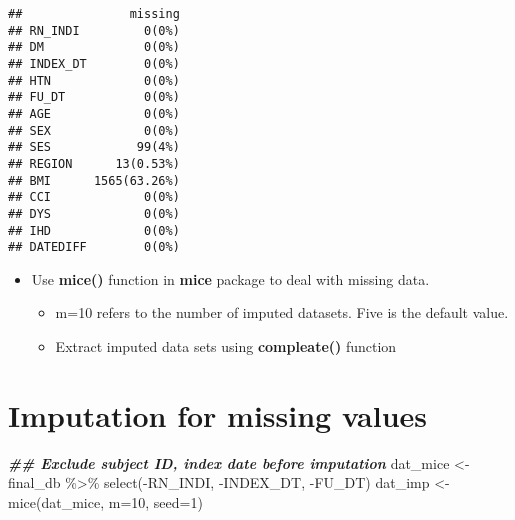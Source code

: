 \documentclass[
]{book}
\newenvironment{Shaded}{\begin{snugshade}}{\end{snugshade}}
\newcommand{\AttributeTok}[1]{\textcolor[rgb]{0.77,0.63,0.00}{#1}}
\newcommand{\DecValTok}[1]{\textcolor[rgb]{0.00,0.00,0.81}{#1}}
\newcommand{\DocumentationTok}[1]{\textcolor[rgb]{0.56,0.35,0.01}{\textbf{\textit{#1}}}}
\newcommand{\FunctionTok}[1]{\textcolor[rgb]{0.00,0.00,0.00}{#1}}
\newcommand{\NormalTok}[1]{#1}
\newcommand{\OtherTok}[1]{\textcolor[rgb]{0.56,0.35,0.01}{#1}}
\newcommand{\SpecialCharTok}[1]{\textcolor[rgb]{0.00,0.00,0.00}{#1}}
\providecommand{\tightlist}{%
  \setlength{\itemsep}{0pt}\setlength{\parskip}{0pt}}
\theoremstyle{definition}
\theoremstyle{definition}
\theoremstyle{definition}
\theoremstyle{definition}
\theoremstyle{remark}
\begin{document}
\begin{verbatim}
##               missing
## RN_INDI         0(0%)
## DM              0(0%)
## INDEX_DT        0(0%)
## HTN             0(0%)
## FU_DT           0(0%)
## AGE             0(0%)
## SEX             0(0%)
## SES            99(4%)
## REGION      13(0.53%)
## BMI      1565(63.26%)
## CCI             0(0%)
## DYS             0(0%)
## IHD             0(0%)
## DATEDIFF        0(0%)
\end{verbatim}

\begin{itemize}
\tightlist
\item
  Use \textbf{mice()} function in \textbf{mice} package to deal with missing data.

  \begin{itemize}
  \tightlist
  \item
    m=10 refers to the number of imputed datasets. Five is the default value.
  \item
    Extract imputed data sets using \textbf{compleate()} function
  \end{itemize}
\end{itemize}

\hypertarget{imputation-for-missing-values}{%
\section{Imputation for missing values}\label{imputation-for-missing-values}}

\begin{Shaded}
\begin{Highlighting}[]
\DocumentationTok{\#\# Exclude subject ID, index date before imputation}
\NormalTok{dat\_mice }\OtherTok{\textless{}{-}}\NormalTok{ final\_db }\SpecialCharTok{\%\textgreater{}\%} \FunctionTok{select}\NormalTok{(}\SpecialCharTok{{-}}\NormalTok{RN\_INDI, }\SpecialCharTok{{-}}\NormalTok{INDEX\_DT, }\SpecialCharTok{{-}}\NormalTok{FU\_DT) }
\NormalTok{dat\_imp }\OtherTok{\textless{}{-}} \FunctionTok{mice}\NormalTok{(dat\_mice, }\AttributeTok{m=}\DecValTok{10}\NormalTok{, }\AttributeTok{seed=}\DecValTok{1}\NormalTok{)}
\end{Highlighting}
\end{Shaded}
\end{document}

